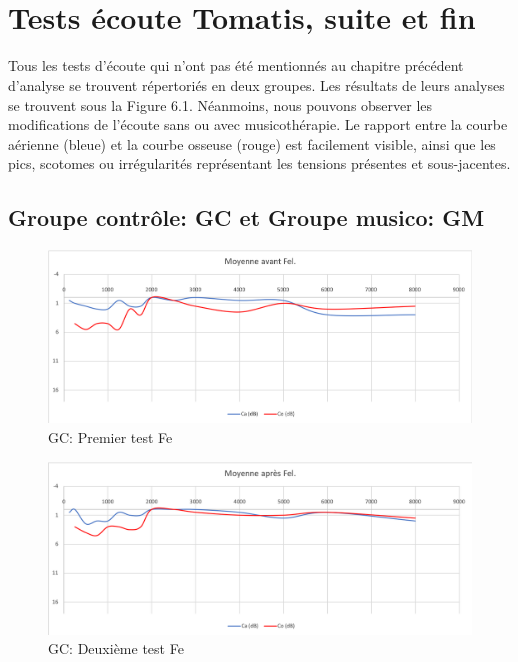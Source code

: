 \section{Tests écoute Tomatis\textsuperscript \textregistered, suite et fin }

Tous les  tests d'écoute qui n'ont pas été mentionnés au chapitre précédent d'analyse  se trouvent 
répertoriés
en deux groupes. Les résultats de leurs analyses se trouvent sous la Figure  6.1.
Néanmoins, nous pouvons observer les modifications de l'écoute sans ou avec musicothérapie.
Le rapport entre la courbe aérienne (bleue) et la courbe osseuse (rouge) est facilement visible, ainsi que 
les pics, scotomes ou irrégularités représentant les tensions présentes et sous-jacentes.
 \subsection*{Groupe contrôle: GC  et Groupe musico: GM}
 
  \begin{figure}[th]
 	\centering
 	\includegraphics[width=0.7\linewidth]{images/graphiques/moyavFEL.png}
 	\caption[GC: Patient Fe: 1° test]{GC: Premier test Fe}
 \end{figure}
 \begin{figure}[th]
 	\centering
 	\includegraphics[width=0.7\linewidth]{images/graphiques/moyaprFEL.png}
 	\caption[GC: Patient Fe: 2° test]{GC: Deuxième test Fe}
 \end{figure}
 
 

